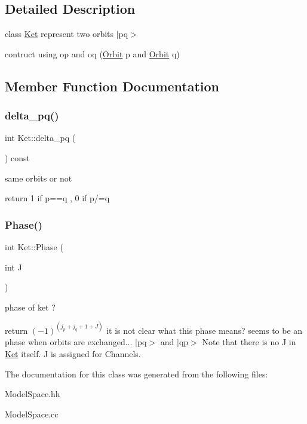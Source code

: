 \subsection{Detailed Description}
class \hyperlink{classKet}{Ket} represent two orbits $\vert$pq$>$

contruct using op and oq (\hyperlink{classOrbit}{Orbit} p and \hyperlink{classOrbit}{Orbit} q) 

\subsection{Member Function Documentation}
\mbox{\label{classKet_ab0b7b429bb33880b1e1302d70d93194a}} 
\subsubsection{\texorpdfstring{delta\+\_\+pq()}{delta\_pq()}}
{\footnotesize\ttfamily int Ket\+::delta\+\_\+pq (\begin{DoxyParamCaption}{ }\end{DoxyParamCaption}) const\hspace{0.3cm}{\ttfamily [inline]}}

same orbits or not

return 1 if p==q , 0 if p/=q \mbox{\label{classKet_ac07bfbc7c7f2bdf77341ba6d54036e8e}} 
\subsubsection{\texorpdfstring{Phase()}{Phase()}}
{\footnotesize\ttfamily int Ket\+::\+Phase (\begin{DoxyParamCaption}\item[{int}]{J }\end{DoxyParamCaption})}

phase of ket ?

return $ (-1)^{(j_p+j_q+1+J)} $ it is not clear what this phase means? seems to be an phase when orbits are exchanged... $\vert$pq$>$ and $\vert$qp$>$ Note that there is no J in \hyperlink{classKet}{Ket} itself. J is assigned for Channels. 

The documentation for this class was generated from the following files\+:\begin{DoxyCompactItemize}
\item 
Model\+Space.\+hh\item 
Model\+Space.\+cc\end{DoxyCompactItemize}
